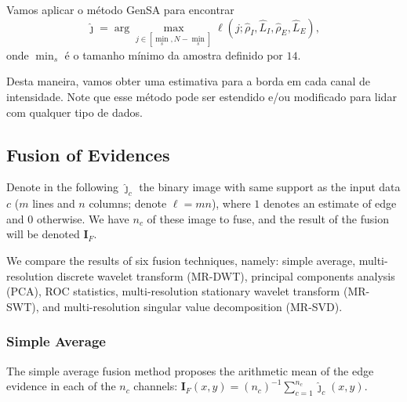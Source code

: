 \documentclass[journal]{IEEEtran}
\begin{document}
Vamos aplicar o método GenSA para encontrar
$$
\widehat{\jmath}= \arg\max\limits_{j\in [\min_s,N-\min_s]}\ell(j;\widehat{\rho}_I, \widehat{L}_I,\widehat{\rho}_E, \widehat{L}_E),
$$ 
onde $\min_s$ é o tamanho mínimo da amostra definido por $14$.

Desta maneira, vamos obter uma estimativa para a borda em cada canal de intensidade.
Note que esse método pode ser estendido e/ou modificado para lidar com qualquer tipo de dados.





\subsection{Fusion of Evidences}\label{sec_04}

Denote in the following $\widehat{\bm\jmath}_c$ the binary image with same support as the input data $c$ ($m$ lines and $n$ columns; denote $\ell=mn$), where $1$ denotes an estimate of edge and $0$ otherwise.
We have $n_c$ of these image to fuse, and the result of the fusion will be denoted $\bm I_F$.

We compare the results of six fusion techniques, namely:
simple average, 
multi-resolution discrete wavelet transform (MR-DWT),
principal components analysis (PCA), 
ROC statistics,
multi-resolution stationary wavelet transform (MR-SWT), and
multi-resolution singular value decomposition (MR-SVD).



\subsubsection{Simple Average}
The simple average fusion method proposes the arithmetic mean of the edge evidence in each of the $n_c$ channels:
$\bm I_F(x,y)=(n_c)^{-1}\sum_{c=1}^{n_c} \widehat{\bm\jmath}_c(x,y)$.
\end{document}

